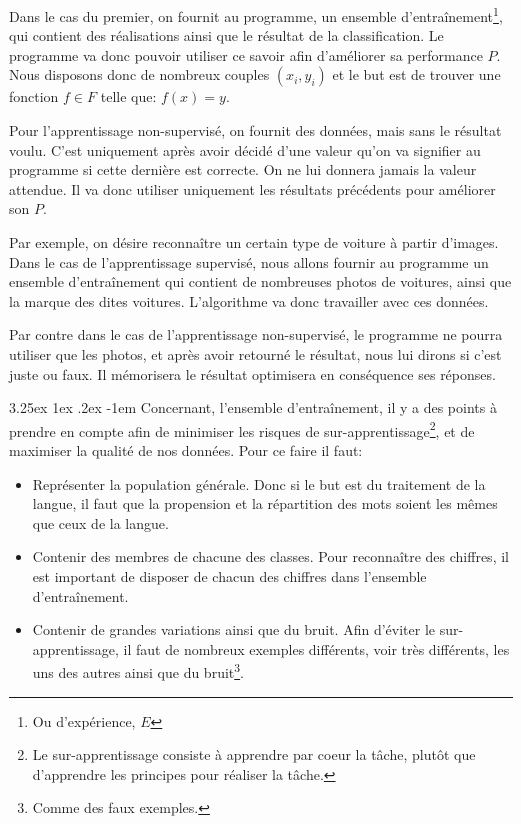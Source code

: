 \documentclass[a4paper, 11pt]{article}
\makeatletter
\renewcommand\paragraph{\@startsection{paragraph}{5}{\z@}%
  {3.25ex \@plus1ex \@minus.2ex}%
  {-1em}%
  {\normalfont\normalsize\bfseries}}
\makeatother
\begin{document}
Dans le cas du premier, on fournit au programme, un ensemble d'entraînement\footnote{Ou d'expérience, $E$},
qui contient des réalisations ainsi que le résultat de la classification. 
Le programme va donc pouvoir utiliser ce savoir afin d'améliorer sa performance $P$.
Nous disposons donc de nombreux couples $(x_i, y_i)$ et le but est de trouver une fonction $f \in F$ telle que: $f(x) = y$.

Pour l'apprentissage non-supervisé, on fournit des données, mais sans le résultat voulu.
C'est uniquement après avoir décidé d'une valeur qu'on va signifier au programme si cette dernière est correcte.
On ne lui donnera jamais la valeur attendue. Il va donc utiliser uniquement les résultats précédents pour améliorer son $P$.

Par exemple, on désire reconnaître un certain type de voiture à partir d'images. Dans le cas de l'apprentissage supervisé,
nous allons fournir au programme un ensemble d'entraînement qui contient de nombreuses photos de voitures,
ainsi que la marque des dites voitures. L'algorithme va donc travailler avec ces données.

Par contre dans le cas de l'apprentissage non-supervisé, le programme ne pourra utiliser que les photos,
et après avoir retourné le résultat, nous lui dirons si c'est juste ou faux. Il mémorisera le résultat 
optimisera en conséquence ses réponses.

\paragraph{}
Concernant, l'ensemble d'entraînement, il y a des points à prendre en compte afin de minimiser les risques de sur-apprentissage\footnote{Le sur-apprentissage consiste à apprendre par coeur la tâche, plutôt que d'apprendre les principes pour réaliser la tâche.}, et de maximiser la qualité de nos données.
Pour ce faire il faut:\label{astuce ensemble d'entraînement}
\begin{itemize}
\item Représenter la population générale. Donc si le but est du traitement de la langue, 
il faut que la propension et la répartition des mots soient les mêmes que ceux de la langue.

\item Contenir des membres de chacune des classes. Pour reconnaître des chiffres, il est important de disposer de chacun 
des chiffres dans l'ensemble d'entraînement.
\item Contenir de grandes variations ainsi que du bruit. Afin d'éviter le sur-apprentissage, 
il faut de nombreux exemples différents, voir très différents, les uns des autres ainsi que 
du bruit\footnote{Comme des faux exemples.}.
\end{itemize}
\end{document}

